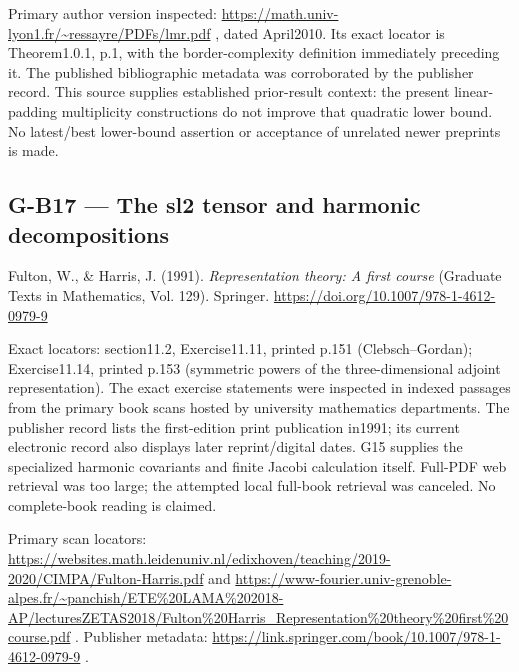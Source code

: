 \documentclass[11pt,a4paper]{article}
\theoremstyle{definition}\newtheorem{definition}{Definition}
\begin{document}
Primary author version inspected:
\url{https://math.univ-lyon1.fr/~ressayre/PDFs/lmr.pdf} , dated
April2010. Its exact locator is Theorem1.0.1, p.1, with the
border-complexity definition immediately preceding it. The published
bibliographic metadata was corroborated by the publisher record. This
source supplies established prior-result context: the present
linear-padding multiplicity constructions do not improve that quadratic
lower bound. No latest/best lower-bound assertion or acceptance of
unrelated newer preprints is made.

\subsection{G-B17 --- The sl2 tensor and harmonic
decompositions}\label{g-b17--the-sl2-tensor-and-harmonic-decompositions}

Fulton, W., \& Harris, J. (1991). \emph{Representation theory: A first
course} (Graduate Texts in Mathematics, Vol. 129). Springer.
\url{https://doi.org/10.1007/978-1-4612-0979-9}

Exact locators: section11.2, Exercise11.11, printed p.151
(Clebsch--Gordan); Exercise11.14, printed p.153 (symmetric powers of the
three-dimensional adjoint representation). The exact exercise statements
were inspected in indexed passages from the primary book scans hosted by
university mathematics departments. The publisher record lists the
first-edition print publication in1991; its current electronic record
also displays later reprint/digital dates. G15 supplies the specialized
harmonic covariants and finite Jacobi calculation itself. Full-PDF web
retrieval was too large; the attempted local full-book retrieval was
canceled. No complete-book reading is claimed.

Primary scan locators:
\url{https://websites.math.leidenuniv.nl/edixhoven/teaching/2019-2020/CIMPA/Fulton-Harris.pdf}
and
\url{https://www-fourier.univ-grenoble-alpes.fr/~panchish/ETE\%20LAMA\%202018-AP/lecturesZETAS2018/Fulton\%20Harris_Representation\%20theory\%20first\%20course.pdf}
. Publisher metadata:
\url{https://link.springer.com/book/10.1007/978-1-4612-0979-9} .
\end{document}
